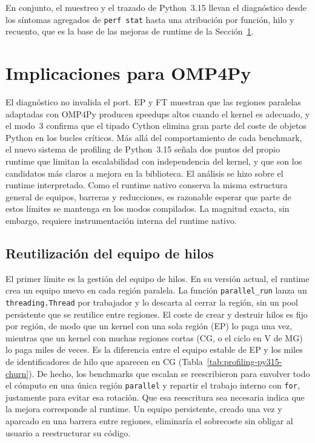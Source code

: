 En conjunto, el muestreo y el trazado de Python~3.15 llevan el diagnóstico desde
los síntomas agregados de \texttt{perf stat} hasta una atribución por función,
hilo y recuento, que es la base de las mejoras de runtime de la
Sección~\ref{sec:profiling-implicaciones}.


\section{Implicaciones para OMP4Py}
\label{sec:profiling-implicaciones}

El diagnóstico no invalida el port. EP y FT muestran que las regiones paralelas
adaptadas con OMP4Py producen speedups altos cuando el kernel es adecuado, y el
modo~3 confirma que el tipado Cython elimina gran parte del coste de objetos
Python en los bucles críticos. Más allá del comportamiento de cada benchmark, el
nuevo sistema de profiling de Python~3.15 señala dos puntos del propio runtime
que limitan la escalabilidad con independencia del kernel, y que son los
candidatos más claros a mejora en la biblioteca. El análisis se hizo sobre el
runtime interpretado. Como el runtime nativo conserva la misma estructura general
de equipos, barreras y reducciones, es razonable esperar que parte de estos
límites se mantenga en los modos compilados. La magnitud exacta, sin embargo,
requiere instrumentación interna del runtime nativo.

\subsection{Reutilización del equipo de hilos}
El primer límite es la gestión del equipo de hilos. En su versión actual, el
runtime crea un equipo nuevo en cada región paralela. La función
\texttt{parallel\_run} lanza un \texttt{threading.Thread} por trabajador y lo
descarta al cerrar la región, sin un pool persistente que se reutilice entre
regiones. El coste de crear y destruir hilos es fijo por región, de modo que un
kernel con una sola región (EP) lo paga una vez, mientras que un kernel con
muchas regiones cortas (CG, o el ciclo en V de MG) lo paga miles de veces. Es la
diferencia entre el equipo estable de EP y los miles de identificadores de hilo
que aparecen en CG (Tabla~\ref{tab:profiling-py315-churn}). De hecho, los
benchmarks que
escalan se reescribieron para envolver todo el cómputo en una única región
\texttt{parallel} y repartir el trabajo interno con \texttt{for}, justamente para
evitar esa rotación. Que esa reescritura sea necesaria indica que la mejora
corresponde al runtime. Un equipo persistente, creado una vez y aparcado en una
barrera entre regiones, eliminaría el sobrecoste sin obligar al usuario a
reestructurar su código.


